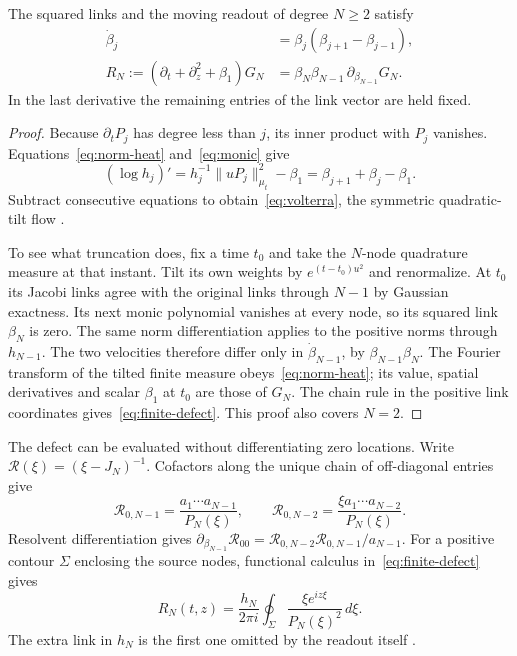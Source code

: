\begin{proposition}\label{prop:defect}
The squared links and the moving readout of degree \(N\ge2\) satisfy
\begin{align}
 \dot\beta_j&=\beta_j(\beta_{j+1}-\beta_{j-1}), \label{eq:volterra}\\
 R_N:=(\partial_t+\partial_z^2+\beta_1)G_N
     &=\beta_N\beta_{N-1}\,\partial_{\beta_{N-1}}G_N .
 \label{eq:finite-defect}
\end{align}
In the last derivative the remaining entries of the link vector are held fixed.
\end{proposition}
\begin{proof}
Because \(\partial_t P_j\) has degree less than \(j\), its inner product with \(P_j\) vanishes. Equations~\eqref{eq:norm-heat} and~\eqref{eq:monic} give
\[
 (\log h_j)'=h_j^{-1}\|uP_j\|_{\mu_t}^2-\beta_1
            =\beta_{j+1}+\beta_j-\beta_1.
\]
Subtract consecutive equations to obtain~\eqref{eq:volterra}, the symmetric quadratic-tilt flow \cite[\S2.3]{vanassche}.

To see what truncation does, fix a time \(t_0\) and take the \(N\)-node quadrature measure at that instant. Tilt its own weights by \(e^{(t-t_0)u^2}\) and renormalize. At \(t_0\) its Jacobi links agree with the original links through \(N-1\) by Gaussian exactness. Its next monic polynomial vanishes at every node, so its squared link \(\beta_N\) is zero. The same norm differentiation applies to the positive norms through \(h_{N-1}\). The two velocities therefore differ only in \(\dot\beta_{N-1}\), by \(\beta_{N-1}\beta_N\). The Fourier transform of the tilted finite measure obeys~\eqref{eq:norm-heat}; its value, spatial derivatives and scalar \(\beta_1\) at \(t_0\) are those of \(G_N\). The chain rule in the positive link coordinates gives~\eqref{eq:finite-defect}. This proof also covers \(N=2\).
\end{proof}

The defect can be evaluated without differentiating zero locations. Write \(\mathcal R(\xi)=(\xi-J_N)^{-1}\). Cofactors along the unique chain of off-diagonal entries give
\[
 \mathcal R_{0,N-1}=\frac{a_1\cdots a_{N-1}}{P_N(\xi)},\qquad
 \mathcal R_{0,N-2}=\frac{\xi a_1\cdots a_{N-2}}{P_N(\xi)} .
\]
Resolvent differentiation gives \(\partial_{\beta_{N-1}}\mathcal R_{00}=
\mathcal R_{0,N-2}\mathcal R_{0,N-1}/a_{N-1}\). For a positive contour \(\Sigma\) enclosing the source nodes, functional calculus in~\eqref{eq:finite-defect} gives
\begin{equation}
 R_N(t,z)=\frac{h_N}{2\pi i}\oint_\Sigma
                \frac{\xi e^{iz\xi}}{P_N(\xi)^2}\,d\xi . \label{eq:sr}
\end{equation}
The extra link in \(h_N\) is the first one omitted by the readout itself \cite{vcd}.

